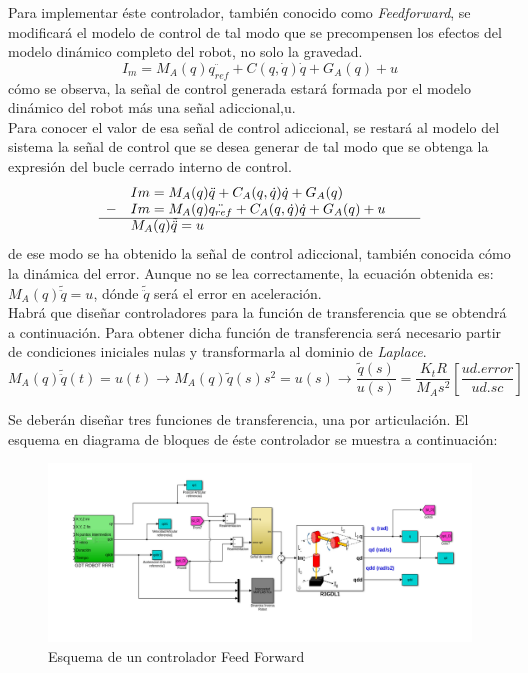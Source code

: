 	Para implementar éste controlador, también conocido como \textit{Feedforward}, se modificará el modelo de control de tal modo que se precompensen los efectos del modelo dinámico completo del robot, no solo la gravedad.
	\begin{equation}
		I_m= M_{A}(q)\ddot{q_{ref}} + C(q,\dot{q})\dot{q} + G_{A}(q) + u
	\end{equation}
cómo se observa, la señal de control generada estará formada por el modelo dinámico del robot más una señal adiccional,u.\\
Para conocer el valor de esa señal de control adiccional, se restará al modelo del sistema la señal de control que se desea generar de tal modo que se obtenga la expresión del bucle cerrado interno de control.
\begin{equation}
	\begin{array}{llll}
	  & Im=M_{A}(q)\ddot{q} + C_{A}(q,\dot{q})\dot{q} + G_{A}(q) \\
	- & Im=M_{A}(q)\ddot{q_{ref}} + C_{A}(q,\dot{q})\dot{q} + G_{A}(q) + u \\
	\cline{1-4}
	  & M_{A}(q)\tilde{\ddot{q}} = u & &
	\end{array}
\end{equation}
de ese modo se ha obtenido la señal de control adiccional, también conocida cómo la dinámica del error. Aunque no se lea correctamente, la ecuación obtenida es: $M_{A}(q)\tilde{\ddot{q}} = u$, dónde $\tilde{\ddot{q}}$ será el error en aceleración. \\
Habrá que diseñar controladores para la función de transferencia que se obtendrá a continuación. Para obtener dicha función de transferencia será necesario partir de condiciones iniciales nulas y transformarla al dominio de \textit{Laplace}.
\begin{equation}
	M_{A}(q)\tilde{\ddot{q}}(t) = u(t) \rightarrow M_{A}(q)\tilde{q}(s)s^{2} = u(s) \rightarrow \frac{\tilde{q}(s)}{u(s)}=\frac{K_{t}R}{M_{A}s^{2}}[\frac{ud.error}{ud.sc}]
\end{equation}

Se deberán diseñar tres funciones de transferencia, una por articulación. El esquema en diagrama de bloques de éste controlador se muestra a continuación:

\begin{figure}[h!]
	\centering
	\includegraphics[width=.8\textwidth]{montaje_feedforward}
	\caption{Esquema de un controlador Feed Forward}
\end{figure}

